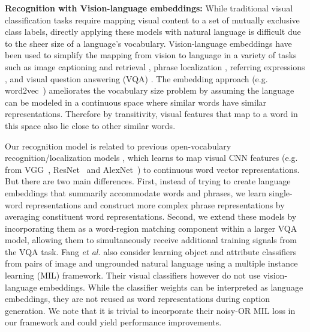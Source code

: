 \documentclass[10pt,twocolumn,letterpaper]{article}
\begin{document}
\noindent \textbf{Recognition with Vision-language embeddings:} While traditional visual classification tasks require mapping visual content to a set of mutually exclusive class labels, directly applying these models with natural language is difficult due to the sheer size of a language's vocabulary. Vision-language embeddings have been used to simplify the mapping from vision to language in a variety of tasks such as image captioning and retrieval \cite{lin2014microsoft,hodosh2013framing}, phrase localization \cite{plummer2015flickr30k,krishna2016visual}, referring 
expressions \cite{KazemzadehOrdonezMattenBergEMNLP14,Mao2016cvpr}, and visual question answering (VQA) \cite{antol2015vqa,ren2015nips,yu2015visual}. The embedding approach (e.g. word2vec~\cite{mikolov2013efficient}) ameliorates the vocabulary size problem by assuming the language can be modeled in a continuous space where similar words have similar representations. Therefore by transitivity, visual features that map to a word in this space also lie close to other similar words. 

Our recognition model is related to previous open-vocabulary recognition/localization models \cite{wang2016learning,rohrbach2016grounding,gong2014improving}, which learns to map visual CNN features (e.g. from VGG~\cite{simonyan2014very}, ResNet~\cite{he2015deep} and AlexNet~\cite{krizhevsky2012imagenet}) to continuous word vector representations. But there are two main differences. First, instead of trying to create language embeddings that summarily accommodate words and phrases, we learn single-word representations and construct more complex phrase representations by averaging constituent word representations. Second, we extend these models by incorporating them as a word-region matching component within a larger VQA model, allowing them to simultaneously receive additional training signals from the VQA task. Fang \emph{et al.} \cite{fang2015cvpr} also consider learning object and attribute classifiers from pairs of image and ungrounded natural language using a multiple instance learning (MIL) framework. Their visual classifiers however do not use vision-language embeddings. While the classifier weights can be interpreted as language embeddings, they are not reused as word representations during caption generation. We note that it is trivial to incorporate their noisy-OR MIL loss in our framework and could yield performance improvements.


\end{document}
